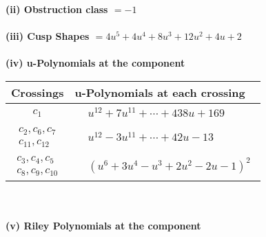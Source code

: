 \documentclass[1p]{elsarticle_modified}
\theoremstyle{definition}
\begin{document}
\flushleft \textbf{(ii) Obstruction class $= -1$}\\~\\
\flushleft \textbf{(iii) Cusp Shapes $= 4 u^5+4 u^4+8 u^3+12 u^2+4 u+2$}\\~\\
\newpage\renewcommand{\arraystretch}{1}
\flushleft \textbf{(iv) u-Polynomials at the component}\newline \\
\begin{tabular}{m{50pt}|m{274pt}}
Crossings & \hspace{64pt}u-Polynomials at each crossing \\
\hline $$\begin{aligned}c_{1}\end{aligned}$$&$\begin{aligned}
&u^{12}+7 u^{11}+\cdots+438 u+169
\end{aligned}$\\
\hline $$\begin{aligned}c_{2},c_{6},c_{7}\\c_{11},c_{12}\end{aligned}$$&$\begin{aligned}
&u^{12}-3 u^{11}+\cdots+42 u-13
\end{aligned}$\\
\hline $$\begin{aligned}c_{3},c_{4},c_{5}\\c_{8},c_{9},c_{10}\end{aligned}$$&$\begin{aligned}
&(u^6+3 u^4- u^3+2 u^2-2 u-1)^2
\end{aligned}$\\
\hline
\end{tabular}\\~\\
\newpage\renewcommand{\arraystretch}{1}
\flushleft \textbf{(v) Riley Polynomials at the component}\newline \\
\end{document}
